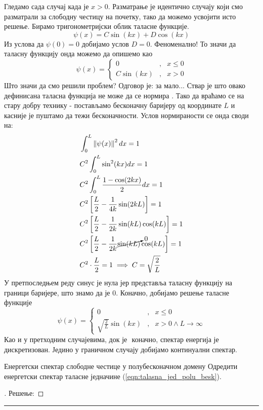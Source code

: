 \documentclass{tufte-handout} %
\theoremstyle{definition}
\theoremstyle{remark}
\newcommand{\norm}[1]{\left\lVert #1 \right\rVert}
\begin{document}
Гледамо сада случај када је $x>0$. Разматрање је идентично случају који смо разматрали за слободну честицу на почетку, тако да можемо усвојити исто решење. Бирамо тригонометријски облик таласне функције.
\begin{equation*}
	\psi(x)=C\sin(kx) + D\cos(kx)
\end{equation*}
Из услова да $\psi(0)=0$ добијамо услов $D=0$. Феноменално! То значи да таласну функцију онда можемо да опишемо као
\begin{equation}
	\psi(x) = \left\{ \begin{array}{rcl}
		0 & \mbox{,}
		& x\leq0 \\ 
		C\sin(kx) & \mbox{,} & x>0
	\end{array}\right.
\end{equation}
Што значи да смо решили проблем? Одговор је: за мало... Ствар је што овако дефинисана таласна функција не може да се нормира \Sadey. Тако да враћамо се на стару добру технику - постављамо бесконачну баријеру од координате $L$ и касније је пуштамо да тежи бесконачности. Услов нормираности се онда своди на:
\begin{align*}
	&\int_{0}^{L}\norm{\psi(x)}^2dx = 1\\
	&C^2\int_{0}^{L}\sin^2(kx)dx=1\\
	&C^2\int_{0}^{L}\frac{1-\cos(2kx)}{2}dx=1\\
	&C^2\left[\frac{L}{2}-\frac{1}{4k}\sin(2kL)\right]=1\\
	&C^2\left[\frac{L}{2}-\frac{1}{2k}\sin(kL)\cos(kL)\right]=1\\
	&C^2\left[\frac{L}{2}-\frac{1}{2k}\cancelto{0}{\sin(kL)}\cos(kL)\right]=1\\
	&C^2\cdot\frac{L}{2}=1\implies C=\sqrt{\frac{2}{L}}
\end{align*}
У претпоследњем реду синус је нула јер представља таласну функцију на граници баријере, што знамо да је 0. Коначно, добијамо решење таласне функције
\begin{equation}\label{eqn:talasna_jed_polu_besk}
	\psi(x) = \left\{ \begin{array}{rcl}
		0 & \mbox{,}
		& x\leq0 \\ 
		\sqrt{\frac{2}{L}}\sin(kx) & \mbox{,} & x>0 \wedge L\rightarrow\infty
	\end{array}\right.
\end{equation}
Као и у претходним случајевима, док је $ $ коначно, спектар енергија је дискретизован. Једино у граничном случају добијамо континуални спектар.\par
\begin{mdframed}
	
\begin{zadatak}{Енергетски спектар слободне честице у полубесконачном домену}{}
	Одредити енергетски спектар таласне једначине (\ref{eqn:talasna_jed_polu_besk}).
\end{zadatak}
\begin{proof}[\unskip\nopunct]
Решење:\par
\lipsum[1-6]
\end{proof}

\end{mdframed}
\vspace{1em}
\hrule
\end{document}
